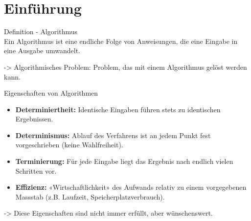 \section{Einführung}\label{sec:Einführung}

\begin{definition}{Definition - Algorithmus\\}
    Ein Algorithmus ist eine endliche Folge von Anweisungen, die eine Eingabe in eine Ausgabe umwandelt.
\end{definition}

-> Algorithmisches Problem: Problem, das mit einem Algorithmus gelöst werden kann.
\\

\begin{concept}{Eigenschaften von Algorithmen}
    \\
    \begin{itemize}
        \item \textbf{Determiniertheit:} Identische Eingaben führen stets zu identischen Ergebnissen.
        \item \textbf{Determinismus:} Ablauf des Verfahrens ist an jedem Punkt fest vorgeschrieben (keine Wahlfreiheit).
        \item \textbf{Terminierung:} Für jede Eingabe liegt das Ergebnis nach endlich vielen Schritten vor.
        \item \textbf{Effizienz:} «Wirtschaftlichkeit» des Aufwands relativ zu einem vorgegebenen Massstab (z.B. Laufzeit, Speicherplatzverbrauch).
    \end{itemize}
    -> Diese Eigenschaften sind nicht immer erfüllt, aber wünschenswert.
\end{concept}




